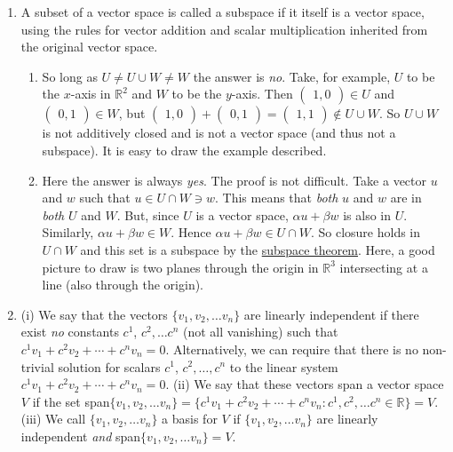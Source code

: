 \begin{enumerate}
\item  A subset of a vector space is called a subspace if it itself is a vector space, using the rules for vector addition and scalar
multiplication inherited from the original vector space.

\begin{enumerate}
\item So long as  $U\neq U\cup W\neq W$ the answer is {\it no}.  Take, for example, $U$ to be the $x$-axis in ${\mathbb R}^2$
and $W$ to be the $y$-axis. Then $\begin{pmatrix}1,0\end{pmatrix}\in U$ and $\begin{pmatrix}0,1\end{pmatrix}\in W$, but 
$\begin{pmatrix}1,0\end{pmatrix}+\begin{pmatrix}0,1\end{pmatrix}=\begin{pmatrix}1,1\end{pmatrix}\notin U\cup W$.
So $U\cup W$ is not additively closed and is not a vector space (and thus not a subspace). It is easy to draw the example described.
\item Here the answer is always {\it yes}. The proof is not difficult. Take a vector $u$ and $w$ such that $u\in U\cap W\ni w$. This means
that {\it both} $u$ and $w$ are in {\it both} $U$ and $W$. But, since $U$ is a vector space, $\alpha u + \beta w$ is also in $U$.
Similarly, $\alpha u + \beta w \in W$. Hence $\alpha u + \beta w\in U\cap W$. So closure holds in $U\cap W$ and this set is a subspace
by the \hyperref[subspacetheorem]{subspace theorem}. Here, a good picture to draw is two planes through the origin in ${\mathbb R}^3$
intersecting at a line (also through the origin).
\end{enumerate}

\item (i) We say that the vectors $\{v_1,v_2,\ldots v_n\}$ are linearly independent if there exist {\it no} constants $c^1$, $c^2,\ldots c^n$
(not all vanishing) such that $c^1 v_1 + c^2 v_2 +\cdots + c^n v_n=0$. Alternatively, we can require that there is no non-trivial solution for
scalars $c^1$, $c^2,\ldots, c^n $ to  the linear system  $c^1 v_1 + c^2 v_2 +\cdots + c^n v_n=0$.
(ii) We say that these vectors span a vector space $V$ if the set span$\{v_1,v_2,\ldots v_n\}=\{c^1 v_1 + c^2 v_2 +\cdots + c^n v_n:c^1,c^2,\ldots c^n\in  {\mathbb R}\}=V$. (iii) We call $\{v_1,v_2,\ldots v_n\}$ a basis for $V$ if  $\{v_1,v_2,\ldots v_n\}$ are linearly independent {\it and} span$\{v_1,v_2,\ldots v_n\}=V$.


\end{enumerate}
